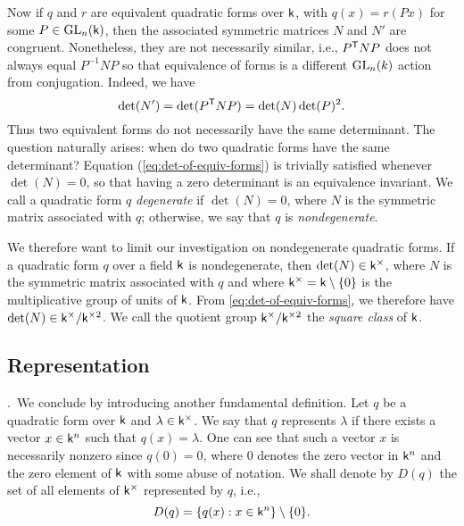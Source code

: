 Now if \(q\) and \(r\) are equivalent quadratic forms over \(\mathsf{k}\), with
\(q(x) = r(Px)\) for some \(P \in \mathrm{GL}_{n}(\mathsf{k})\), then the associated
symmetric matrices \(N\) and \(N'\) are congruent. Nonetheless, they are not
necessarily similar, i.e., \(P^{\mathsf{T}}NP\) does not always equal \(P^{-1}NP\)
so that equivalence of forms is a different \(\mathrm{GL}_{n}(k)\) action from
conjugation. Indeed, we have
\begin{equation}
    \label{eq:det-of-equiv-forms}
    \det(N') = \det(P^{\mathsf{T}}NP) = \det(N)\det(P)^2.
\end{equation}
Thus two equivalent forms do not necessarily have the same determinant. The
question naturally arises: when do two quadratic forms have the same
determinant? Equation (\ref{eq:det-of-equiv-forms}) is trivially satisfied
whenever \(\det(N) = 0\), so that having a zero determinant is an equivalence
invariant. We call a quadratic form \(q\) \emph{degenerate} if \(\det(N) = 0\),
where \(N\) is the symmetric matrix associated with \(q\); otherwise, we say
that \(q\) is \emph{nondegenerate}.

We therefore want to limit our investigation on nondegenerate quadratic forms.
If a quadratic form \(q\) over a field \(\mathsf{k}\) is nondegenerate, then
\(\det(N) \in \mathsf{k}^{\times}\), where \(N\) is the symmetric matrix associated
with \(q\) and where \(\mathsf{k}^{\times} = \mathsf{k} \setminus \{0\}\) is the
multiplicative group of units of \(\mathsf{k}\). From \eqref{eq:det-of-equiv-forms},
we therefore have \(\det(N) \in \mathsf{k}^{\times} / \mathsf{k}^{\times 2}\). We call
the quotient group \(\mathsf{k}^{\times} / \mathsf{k}^{\times 2}\) the \emph{square
class} of \(\mathsf{k}\).
\label{sec:square-classes}

\subsection{Representation}.~We conclude by introducing another fundamental
definition. Let \(q\) be a quadratic form over \(\mathsf{k}\) and \(\lambda \in
\mathsf{k}^{\times}\). We say that \(q\) represents \(\lambda\) if there exists a
vector \(x \in \mathsf{k}^n\) such that \(q(x) = \lambda\). One can see that such a
vector \(x\) is necessarily nonzero since \(q(0) = 0\), where \(0\) denotes the
zero vector in \(\mathsf{k}^n\) and the zero element of \(\mathsf{k}\) with some abuse
of notation. We shall denote by \(D(q)\) the set of all elements of
\(\mathsf{k}^{\times}\) represented by \(q\), i.e.,\label{sec:representation}
\[
  D(q) = \{q(x) : x \in \mathsf{k}^n\} \setminus \{0\}.
\]

